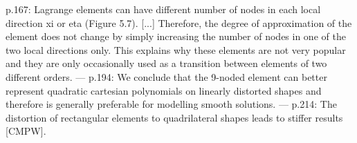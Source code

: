 \documentclass[11pt,a4paper]{article}
\begin{document}
\begin{pasaje}\footnotesize p.167: \textquotedbl{}Lagrange elements can have different number of nodes in each local direction xi or eta (Figure 5.7). [...] Therefore, the degree of approximation of the element does not change by simply increasing the number of nodes in one of the two local directions only. This explains why these elements are not very popular and they are only occasionally used as a transition between elements of two different orders.\textquotedbl{} --- p.194: \textquotedbl{}We conclude that the 9-noded element can better represent quadratic cartesian polynomials on linearly distorted shapes and therefore is generally preferable for modelling smooth solutions.\textquotedbl{} --- p.214: \textquotedbl{}The distortion of rectangular elements to quadrilateral shapes leads to stiffer results [CMPW].\textquotedbl{}\end{pasaje}
\vspace{6pt}
\end{document}
